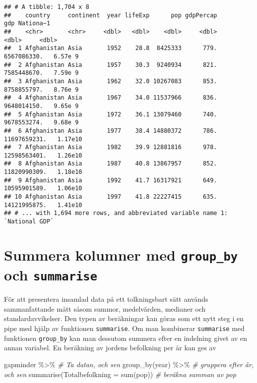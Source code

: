 \documentclass[
]{book}
\newenvironment{Shaded}{\begin{snugshade}}{\end{snugshade}}
\newcommand{\AttributeTok}[1]{\textcolor[rgb]{0.77,0.63,0.00}{#1}}
\newcommand{\CommentTok}[1]{\textcolor[rgb]{0.56,0.35,0.01}{\textit{#1}}}
\newcommand{\FunctionTok}[1]{\textcolor[rgb]{0.00,0.00,0.00}{#1}}
\newcommand{\NormalTok}[1]{#1}
\newcommand{\SpecialCharTok}[1]{\textcolor[rgb]{0.00,0.00,0.00}{#1}}
\theoremstyle{definition}
\theoremstyle{definition}
\theoremstyle{definition}
\theoremstyle{definition}
\theoremstyle{remark}
\begin{document}
\begin{verbatim}
## # A tibble: 1,704 x 8
##    country     continent  year lifeExp      pop gdpPercap          gdp Nationa~1
##    <chr>       <chr>     <dbl>   <dbl>    <dbl>     <dbl>        <dbl>     <dbl>
##  1 Afghanistan Asia       1952    28.8  8425333      779.  6567086330.   6.57e 9
##  2 Afghanistan Asia       1957    30.3  9240934      821.  7585448670.   7.59e 9
##  3 Afghanistan Asia       1962    32.0 10267083      853.  8758855797.   8.76e 9
##  4 Afghanistan Asia       1967    34.0 11537966      836.  9648014150.   9.65e 9
##  5 Afghanistan Asia       1972    36.1 13079460      740.  9678553274.   9.68e 9
##  6 Afghanistan Asia       1977    38.4 14880372      786. 11697659231.   1.17e10
##  7 Afghanistan Asia       1982    39.9 12881816      978. 12598563401.   1.26e10
##  8 Afghanistan Asia       1987    40.8 13867957      852. 11820990309.   1.18e10
##  9 Afghanistan Asia       1992    41.7 16317921      649. 10595901589.   1.06e10
## 10 Afghanistan Asia       1997    41.8 22227415      635. 14121995875.   1.41e10
## # ... with 1,694 more rows, and abbreviated variable name 1: `National GDP`
\end{verbatim}

\hypertarget{summera-kolumner-med-group_by-och-summarise}{%
\section{\texorpdfstring{Summera kolumner med \texttt{group\_by} och \texttt{summarise}}{Summera kolumner med group\_by och summarise}}\label{summera-kolumner-med-group_by-och-summarise}}

För att presentera insamlad data på ett tolkningsbart sätt används sammanfattande mått såsom summor, medelvärden, medianer och standardavvikelser.
Den typen av beräkningar kan göras som ett nytt steg i en pipe med hjälp av funktionen \texttt{summarise}. Om man kombinerar \texttt{summarise} med funktionen \texttt{group\_by} kan man dessutom summera efter en indelning givet av en annan variabel. En beräkning av jordens befolkning per år kan ges av

\begin{Shaded}
\begin{Highlighting}[]
\NormalTok{gapminder }\SpecialCharTok{\%\textgreater{}\%}                                    \CommentTok{\# Ta datan, och sen}
  \FunctionTok{group\_by}\NormalTok{(year) }\SpecialCharTok{\%\textgreater{}\%}                             \CommentTok{\# gruppera efter år, och sen}
  \FunctionTok{summarise}\NormalTok{(}\AttributeTok{Totalbefolkning =} \FunctionTok{sum}\NormalTok{(pop))          }\CommentTok{\# beräkna summan av pop}
\end{Highlighting}
\end{Shaded}
\end{document}
